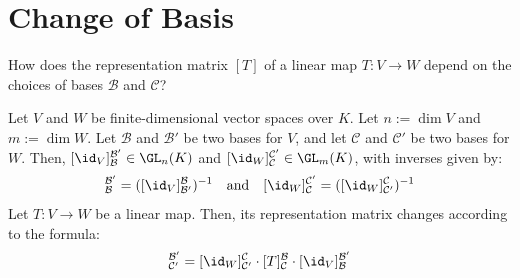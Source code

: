 \renewcommand{\thetheorem}{17.b.\arabic{theorem}}
\setcounter{theorem}{0}


\section{Change of Basis}
\label{sec:change_of_basis}

\begin{question}
How does the representation matrix $[T]$ of a linear map $T: V \to W$ depend on the choices of bases $\mathcal{B}$ and $\mathcal{C}$?
\end{question}

\begin{corollary}
\label{cor:change_of_basis_formula}
Let $V$ and $W$ be finite-di\-men\-sional vector spaces over $K$. Let $n := \dim V$ and $m := \dim W$. Let $\mathcal{B}$ and $\mathcal{B}'$ be two bases for $V$, and let $\mathcal{C}$ and $\mathcal{C}'$ be two bases for $W$. Then, $[\id_V]_{\mathcal{B}}^{\mathcal{B}'} \in \GL_n(K)$ and $[\id_W]_{\mathcal{C}}^{\mathcal{C}'} \in \GL_m(K)$, with inverses given by:
\begin{equation*}
    [\id_V]_{\mathcal{B}}^{\mathcal{B}'} = ([\id_V]_{\mathcal{B}'}^{\mathcal{B}})^{-1} \quad \text{and} \quad [\id_W]_{\mathcal{C}}^{\mathcal{C}'} = ([\id_W]_{\mathcal{C}'}^{\mathcal{C}})^{-1}
\end{equation*}
Let $T: V \to W$ be a linear map. Then, its representation matrix changes according to the formula:
\begin{equation*}
    [T]_{\mathcal{C}'}^{\mathcal{B}'} = [\id_W]_{\mathcal{C}'}^{\mathcal{C}} \cdot [T]_{\mathcal{C}}^{\mathcal{B}} \cdot [\id_V]_{\mathcal{B}}^{\mathcal{B}'}
\end{equation*}
\end{corollary}


